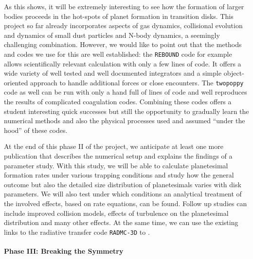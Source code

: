 \documentclass[10pt,fleqn,twoside]{article}
\newcommand{\twopoppy}{\texttt{twopoppy}\xspace}
\newcommand{\rebound}{\texttt{REBOUND}\xspace}
\newcommand{\radmc}{\texttt{RADMC-3D}\xspace}
\begin{document}
As this shows, it will be extremely interesting to see how the
formation of larger bodies proceeds in the hot-spots of planet
formation in transition disks. This project so far already
incorporates aspects of gas dynamics, collisional evolution and
dynamics of small dust particles and N-body dynamics, a seemingly
challenging combination. However, we would like to point out that the
methods and codes we use for this are well established: the \rebound
code for example allows scientifically relevant calculation with only
a few lines of code. It offers a wide variety of well tested and well
documented integrators and a simple object-oriented approach to handle
additional forces or close encounters. The \twopoppy code as well can
be run with only a hand full of lines of code and well reproduces the
results of complicated coagulation codes. Combining these codes offers
a student interesting quick successes but still the opportunity to
gradually learn the numerical methods and also the physical processes
used and assumed ``under the hood'' of these codes.

At the end of this phase II of the project, we anticipate at least one
more publication that describes the numerical setup and explains the
findings of a parameter study. With this study, we will be able to
calculate planetesimal formation rates under various trapping
conditions and study how the general outcome but also the detailed
size distribution of planetesimals varies with disk parameters. We
will also test under which conditions an analytical treatment of the
involved effects, based on rate equations, can be found. Follow up
studies can include improved collision models, effects of turbulence
on the planetesimal distribution and many other effects. At the same
time, we can use the existing links to the radiative transfer code
\radmc to .

\paragraph{Phase III: Breaking the Symmetry}
\label{sec:phaseIII}
\end{document}
